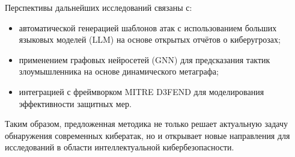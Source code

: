 \documentclass{article}
\begin{document}
Перспективы дальнейших исследований связаны с:
\begin{itemize}
    \item автоматической генерацией шаблонов атак с использованием больших языковых моделей (LLM) на основе открытых отчётов о киберугрозах;
    \item применением графовых нейросетей (GNN) для предсказания тактик злоумышленника на основе динамического метаграфа;
    \item интеграцией с фреймворком MITRE D3FEND для моделирования эффективности защитных мер.
\end{itemize}

Таким образом, предложенная методика не только решает актуальную задачу обнаружения современных кибератак, но и открывает новые направления для исследований в области интеллектуальной кибербезопасности.

\clearpage                                  %
\insertbibliofull                           %



\end{document}
